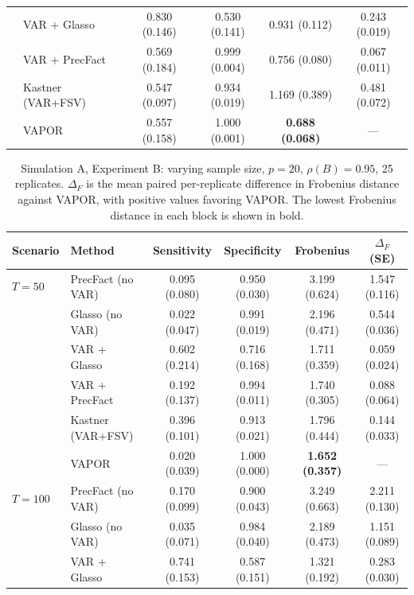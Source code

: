 \begin{table}[h!]
\begin{tabular}{llcccc}
              & VAR + Glasso       & 0.830 (0.146) & 0.530 (0.141) & 0.931 (0.112) & 0.243 (0.019) \\
              & VAR + PrecFact     & 0.569 (0.184) & 0.999 (0.004) & 0.756 (0.080) & 0.067 (0.011) \\
              & Kastner (VAR+FSV)  & 0.547 (0.097) & 0.934 (0.019) & 1.169 (0.389) & 0.481 (0.072) \\
              & VAPOR              & 0.557 (0.158) & 1.000 (0.001) & \textbf{0.688 (0.068)} & --- \\
\bottomrule
\end{tabular}
\end{table}

\begin{table}[h!]
\centering
\small
\setlength{\tabcolsep}{4pt}
\caption{Simulation A, Experiment B: varying sample size, $p=20$, $\rho(B)=0.95$, 25 replicates. $\Delta_F$ is the mean paired per-replicate difference in Frobenius distance against VAPOR, with positive values favoring VAPOR. The lowest Frobenius distance in each block is shown in bold.}
\label{tab:sim-a-samplesize}
\begin{tabular}{llcccc}
\toprule
Scenario & Method & Sensitivity & Specificity & Frobenius & $\Delta_F$ (SE) \\
\midrule
$T = 50$   & PrecFact (no VAR)  & 0.095 (0.080) & 0.950 (0.030) & 3.199 (0.624) & 1.547 (0.116) \\
           & Glasso (no VAR)    & 0.022 (0.047) & 0.991 (0.019) & 2.196 (0.471) & 0.544 (0.036) \\
           & VAR + Glasso       & 0.602 (0.214) & 0.716 (0.168) & 1.711 (0.359) & 0.059 (0.024) \\
           & VAR + PrecFact     & 0.192 (0.137) & 0.994 (0.011) & 1.740 (0.305) & 0.088 (0.064) \\
           & Kastner (VAR+FSV)  & 0.396 (0.101) & 0.913 (0.021) & 1.796 (0.444) & 0.144 (0.033) \\
           & VAPOR              & 0.020 (0.039) & 1.000 (0.000) & \textbf{1.652 (0.357)} & --- \\
\midrule
$T = 100$  & PrecFact (no VAR)  & 0.170 (0.099) & 0.900 (0.043) & 3.249 (0.663) & 2.211 (0.130) \\
           & Glasso (no VAR)    & 0.035 (0.071) & 0.984 (0.040) & 2.189 (0.473) & 1.151 (0.089) \\
           & VAR + Glasso       & 0.741 (0.153) & 0.587 (0.151) & 1.321 (0.192) & 0.283 (0.030) \\

\end{tabular}
\end{table}
